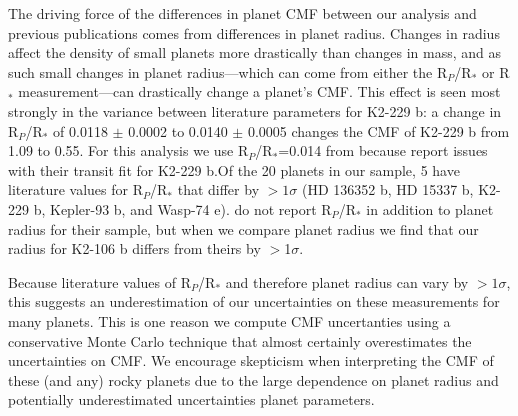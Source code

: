 \documentclass[twocolumn]{aastex631}
\begin{document}
The driving force of the differences in planet CMF between our analysis and previous publications comes from differences in planet radius. Changes in radius affect the density of small planets more drastically than changes in mass, and as such small changes in planet radius---which can come from either the R$_{P}$/R$_{*}$ or R$_{*}$ measurement---can drastically change a planet's CMF. This effect is seen most strongly in the variance between literature parameters for K2-229 b: a change in R$_{P}$/R$_{*}$ of 0.0118 $\pm$ 0.0002 \citep{2021PSJ.....2..152A} to 0.0140 $\pm$ 0.0005 \citep{2019ApJ...883...79D} changes the CMF of K2-229 b from 1.09 to 0.55. For this analysis we use R$_{P}$/R$_{*}$=0.014 from \cite{2019ApJ...883...79D} because \cite{2021PSJ.....2..152A} report issues with their transit fit for K2-229 b.Of the 20 planets in our sample, 5 have literature values for R$_{P}$/R$_{*}$ that differ by $>1 \sigma$ (HD 136352 b, HD 15337 b, K2-229 b, Kepler-93 b, and Wasp-74 e). \cite{Adibekyan2021} do not report R$_{P}$/R$_{*}$ in addition to planet radius for their sample, but when we compare planet radius we find that our radius for K2-106 b differs from theirs by $>$1$\sigma$. 

Because literature values of R$_{P}$/R$_{*}$ and therefore planet radius can vary by $>1\sigma$, this suggests an underestimation of our uncertainties on these measurements for many planets. This is one reason we compute CMF uncertanties using a conservative Monte Carlo technique that almost certainly overestimates the uncertainties on CMF. We encourage skepticism when interpreting the CMF of these (and any) rocky planets due to the large dependence on planet radius and potentially underestimated uncertainties planet parameters. 



   
\end{document}
